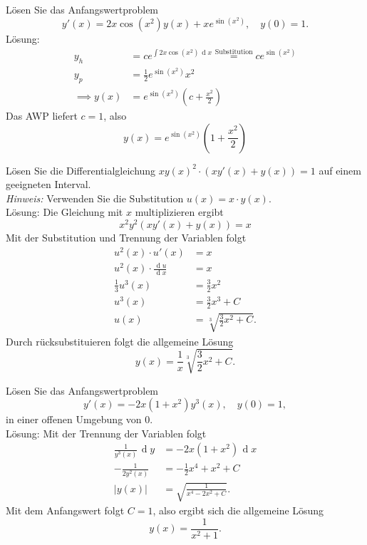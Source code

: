 \documentclass[parskip=full]{scrartcl}
\DeclareMathOperator{\diff}{\mathop{}\!\mathrm{d}}
\begin{document}
Lösen Sie das Anfangswertproblem 
\begin{displaymath}
  y'(x) = 2x \cos(x^2)y(x) + xe^{\sin(x^2)}, \quad y(0) = 1.
\end{displaymath}
Lösung:
\begin{align*}
  y_h &= ce^{\int 2x\cos(x^2) \diff x} \overset{\text{Substitution}}{=} ce^{\sin(x^2)}\\
  y_p &= \frac{1}{2} e^{\sin(x^2)} x^2\\
  \implies y(x) &= e^{\sin(x^2)} \left(c + \frac{x^2}{2}\right)
\end{align*}
Das AWP liefert $c = 1$, also
\begin{displaymath}
  y(x) = e^{\sin(x^2)} \left(1 + \frac{x^2}{2}\right)
\end{displaymath}

Lösen Sie die Differentialgleichung $xy(x)^2 \cdot (xy'(x) + y(x)) = 1$ auf einem geeigneten Interval.\\
\textit{Hinweis:}
Verwenden Sie die Substitution $u(x) = x \cdot y(x)$.\\
Lösung:
Die Gleichung mit $x$ multiplizieren ergibt
\begin{displaymath}
  x^2 y^2 (xy'(x) + y(x)) = x
\end{displaymath}
Mit der Substitution und Trennung der Variablen folgt
\begin{align*}
  u^2(x) \cdot u'(x) &= x\\
  u^2(x) \cdot \frac{\diff u}{\diff x} &= x\\
  \frac{1}{3} u^3(x)& = \frac{3}{2} x^2\\
  u^3(x) &= \frac{3}{2}x^3 + C\\
  u(x) &= \sqrt[3]{\frac{3}{2} x^2 + C}.
\end{align*}
Durch rücksubstituieren folgt die allgemeine Lösung
\begin{displaymath}
  y(x) = \frac{1}{x} \sqrt[3]{\frac{3}{2} x^2 + C}.
\end{displaymath}

Lösen Sie das Anfangswertproblem
\begin{displaymath}
  y'(x) = -2x(1 + x^2)y^3(x), \quad y(0) = 1,
\end{displaymath}
in einer offenen Umgebung von $0$.\\
Lösung:
Mit der Trennung der Variablen folgt
\begin{align*}
  \frac{1}{y^3(x)} \diff y &= -2x(1 + x^2) \diff x\\
  -\frac{1}{2y^2(x)} &= -\frac{1}{2} x^4 + x^2 + C\\
  |y(x)| &= \sqrt{\frac{1}{x^4 - 2x^2 + C}}.
\end{align*}
Mit dem Anfangswert folgt $C = 1$, also ergibt sich die allgemeine Lösung
\begin{displaymath}
  y(x) = \frac{1}{x^2 + 1}.
\end{displaymath}
\end{document}
